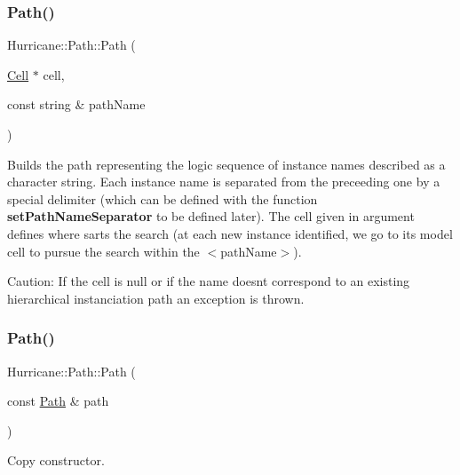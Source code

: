 \subsubsection{\texorpdfstring{Path()}{Path()}\hspace{0.1cm}{\footnotesize\ttfamily [5/6]}}
{\footnotesize\ttfamily Hurricane\+::\+Path\+::\+Path (\begin{DoxyParamCaption}\item[{\mbox{\hyperlink{classHurricane_1_1Cell}{Cell}} $\ast$}]{cell,  }\item[{const string \&}]{path\+Name }\end{DoxyParamCaption})}

Builds the path representing the logic sequence of instance names described as a character string. Each instance name is separated from the preceeding one by a special delimiter (which can be defined with the function {\bfseries set\+Path\+Name\+Separator} to be defined later). The cell given in argument defines where sarts the search (at each new instance identified, we go to its model cell to pursue the search within the {\ttfamily $<$path\+Name$>$}).

\begin{DoxyParagraph}{Caution\+: If the cell is null or if the name doesn\textquotesingle{}t correspond to an }
existing hierarchical instanciation path an exception is thrown. 
\end{DoxyParagraph}
\mbox{\label{classHurricane_1_1Path_a8db875f788013ec5ad8ed517cf1e1715}} 
\subsubsection{\texorpdfstring{Path()}{Path()}\hspace{0.1cm}{\footnotesize\ttfamily [6/6]}}
{\footnotesize\ttfamily Hurricane\+::\+Path\+::\+Path (\begin{DoxyParamCaption}\item[{const \mbox{\hyperlink{classHurricane_1_1Path}{Path}} \&}]{path }\end{DoxyParamCaption})}

Copy constructor. \mbox{\label{classHurricane_1_1Path_a6226639f50213598ffad86031afe69ff}} 
